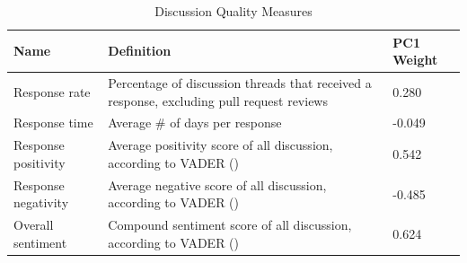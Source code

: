 \begin{longtable}{>{\raggedright\arraybackslash}p{} p{}p{}}
\caption{Discussion Quality Measures}\label{tab:discussion_quality_metrics}\\
\toprule
\textbf{Name} & \textbf{Definition} & \textbf{PC1 Weight} \\
\midrule
\endfirsthead

\bottomrule
\endlastfoot

Response rate & Percentage of discussion threads that received a response, excluding pull request reviews & 0.280 \\
Response time & Average \# of days per response & -0.049\\
Response positivity & Average positivity score of all discussion, according to VADER (\citealt{hutto_vader_2014}) & 0.542\\
Response negativity & Average negative score of all discussion, according to VADER (\citealt{hutto_vader_2014}) & -0.485\\
Overall sentiment & Compound sentiment score of all discussion, according to VADER (\citealt{hutto_vader_2014}) & 0.624 \\
\bottomrule
\end{longtable}

